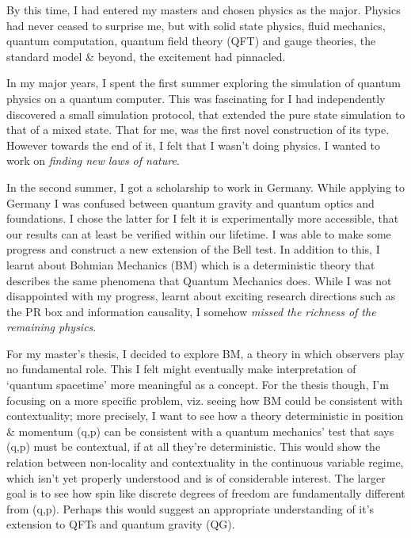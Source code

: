 By this time, I had entered my masters and chosen physics as the major. Physics had never ceased to surprise me, but with solid state physics, fluid mechanics, quantum computation, quantum field theory (QFT) and gauge theories, the standard model \& beyond, the excitement had pinnacled. 


In my major years, I spent the first summer exploring the simulation of quantum physics  on a quantum computer. This was fascinating for I had independently discovered a small simulation protocol, that extended the pure state simulation to that of a mixed state. That for me, was the first novel construction of its type. However towards the end of it, I felt that I wasn't doing physics. I wanted to work on \emph{finding new laws of nature}.


In the second summer, I got a scholarship to work in Germany. While applying to Germany I was confused between quantum gravity and quantum optics and foundations. I chose the latter for I felt it is experimentally more accessible, that our results can at least be verified within our lifetime. I was able to make some progress and construct a new extension of the Bell test. In addition to this, I learnt about Bohmian Mechanics (BM) which is a deterministic theory that describes the same phenomena that Quantum Mechanics does. While I was not disappointed with my progress, learnt about exciting research directions such as the PR box and information causality, I somehow \emph{missed the richness of the remaining physics}.


For my master's thesis, I decided to explore BM, a theory in which observers play no fundamental role. This I felt might eventually make interpretation of `quantum spacetime' more meaningful as a concept. For the thesis though, I'm focusing on a more specific problem, viz. seeing how BM could be consistent with contextuality; more precisely, I want to see how a theory deterministic in position \& momentum (q,p) can be consistent with a quantum mechanics' test that says (q,p) must be contextual, if at all they're deterministic. This would show the relation between non-locality and contextuality in the continuous variable regime, which isn't yet properly understood and is of considerable interest. The larger goal is to see how spin like discrete degrees of freedom are fundamentally different from (q,p). Perhaps this would suggest an appropriate understanding of it's extension to QFTs and quantum gravity (QG).

